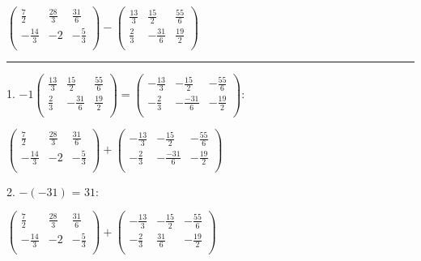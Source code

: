 \documentclass{article}
\begin{document}
$\left(
\begin{array}{ccc}
\frac{7}{2} & \frac{28}{3} & \frac{31}{6} \\
 -\frac{14}{3} & -2 & -\frac{5}{3} \\
\end{array}
\right)-\left(
\begin{array}{ccc}
\frac{13}{3} & \frac{15}{2} & \frac{55}{6} \\
 \frac{2}{3} & -\frac{31}{6} & \frac{19}{2} \\
\end{array}
\right)$

\hrule

1. $-1\left(
\begin{array}{ccc}
\frac{13}{3} & \frac{15}{2} & \frac{55}{6} \\
 \frac{2}{3} & -\frac{31}{6} & \frac{19}{2} \\
\end{array}
\right)=\left(
\begin{array}{ccc}
-\frac{13}{3} & -\frac{15}{2} & -\frac{55}{6} \\
 -\frac{2}{3} & -\frac{-31}{6} & -\frac{19}{2} \\
\end{array}
\right):$

$\left(
\begin{array}{ccc}
\frac{7}{2} & \frac{28}{3} & \frac{31}{6} \\
 -\frac{14}{3} & -2 & -\frac{5}{3} \\
\end{array}
\right)+\left(
\begin{array}{ccc}
-\frac{13}{3} & -\frac{15}{2} & -\frac{55}{6} \\
 -\frac{2}{3} & -\frac{-31}{6} & -\frac{19}{2} \\
\end{array}
\right)$

2. $-(-31)\text{ = }31:$

$\left(
\begin{array}{ccc}
\frac{7}{2} & \frac{28}{3} & \frac{31}{6} \\
 -\frac{14}{3} & -2 & -\frac{5}{3} \\
\end{array}
\right)+\left(
\begin{array}{ccc}
-\frac{13}{3} & -\frac{15}{2} & -\frac{55}{6} \\
 -\frac{2}{3} & \frac{31}{6} & -\frac{19}{2} \\
\end{array}
\right)$
\end{document}
